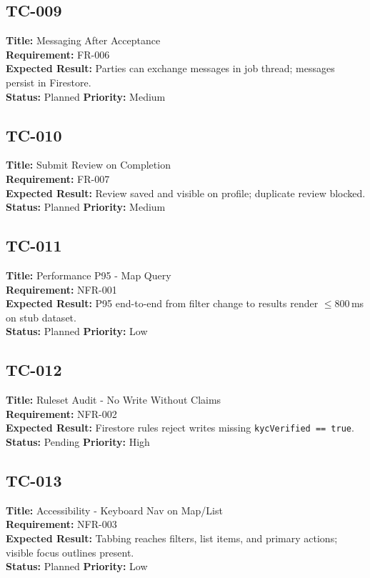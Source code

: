 \documentclass[11pt]{article}
\begin{document}
\subsection*{TC-009}
\textbf{Title:} Messaging After Acceptance \\
\textbf{Requirement:} FR-006 \\
\textbf{Expected Result:} Parties can exchange messages in job thread; messages persist in Firestore. \\
\textbf{Status:} Planned \quad \textbf{Priority:} Medium

\subsection*{TC-010}
\textbf{Title:} Submit Review on Completion \\
\textbf{Requirement:} FR-007 \\
\textbf{Expected Result:} Review saved and visible on profile; duplicate review blocked. \\
\textbf{Status:} Planned \quad \textbf{Priority:} Medium

\subsection*{TC-011}
\textbf{Title:} Performance P95 - Map Query \\
\textbf{Requirement:} NFR-001 \\
\textbf{Expected Result:} P95 end-to-end from filter change to results render \(\leq 800\,\)ms on stub dataset. \\
\textbf{Status:} Planned \quad \textbf{Priority:} Low

\subsection*{TC-012}
\textbf{Title:} Ruleset Audit - No Write Without Claims \\
\textbf{Requirement:} NFR-002 \\
\textbf{Expected Result:} Firestore rules reject writes missing \texttt{kycVerified == true}. \\
\textbf{Status:} Pending \quad \textbf{Priority:} High

\subsection*{TC-013}
\textbf{Title:} Accessibility - Keyboard Nav on Map/List \\
\textbf{Requirement:} NFR-003 \\
\textbf{Expected Result:} Tabbing reaches filters, list items, and primary actions; visible focus outlines present. \\
\textbf{Status:} Planned \quad \textbf{Priority:} Low
\end{document}
